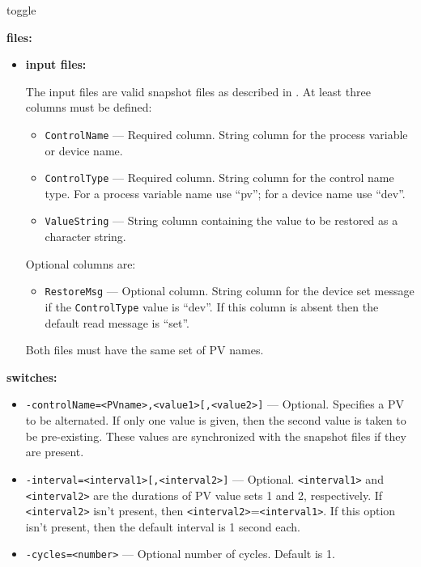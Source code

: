 \begin{sddsprog}{toggle}
\item \textbf{files:}
\begin{itemize}
\item \textbf{input files:}\par
The input files are valid snapshot files as described in . At least three
columns must be defined:
\begin{itemize}
        \item {\tt ControlName} --- Required column. String column for the process variable or device name.
        \item {\tt ControlType} --- Required column. String column for the control name type. For a 
                process variable name use ``pv''; for a device name use ``dev''.
        \item {\tt ValueString} --- String column containing the value to be restored as a character string.
\end{itemize}
Optional columns are:
\begin{itemize}
        \item {\tt RestoreMsg} --- Optional column. String column for the device set message if 
                the {\tt ControlType} value is ``dev''.
                If this column is absent then the default read message is ``set''.
\end{itemize}
        Both files must have the same set of PV names.
\end{itemize}
\item \textbf{switches:}
    \begin{itemize}
        \item {\tt -controlName=<PVname>,<value1>[,<value2>]} --- Optional. Specifies a PV to be
                alternated. If only one value is given, then the second value
                is taken to be pre-existing. These values are synchronized with
                the snapshot files if they are present.
        \item {\tt -interval=<interval1>[,<interval2>]} ---  Optional. \verb+<interval1>+ and \verb+<interval2>+
                 are the durations of PV value sets 1 and 2, respectively.
                 If \verb+<interval2>+ isn't present, then \verb+<interval2>+=\verb+<interval1>+.
                 If this option isn't present, then the default interval is 1 second each.
        \item {\tt -cycles=<number>} --- Optional number of cycles. Default is 1.

\end{itemize}
\end{sddsprog}
